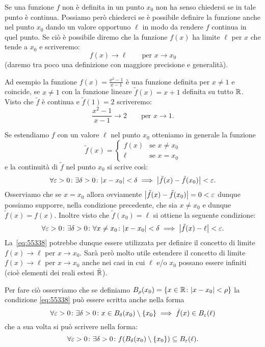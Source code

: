 Se una funzione $f$ non è definita in un punto $x_0$ non ha senso chiedersi
se in tale punto è continua. 
Possiamo però chiederci se è possibile definire la funzione anche nel punto 
$x_0$ dando un valore opportuno $\ell$ in modo da rendere $f$ continua 
in quel punto. 
Se ciò è possibile diremo che la funzione $f(x)$ ha limite $\ell$ 
per $x$ che tende a $x_0$ e scriveremo:
\[
  f(x) \to \ell \qquad \text{per $x\to x_0$}
\]
(daremo tra poco una definizione con maggiore precisione e generalità).

Ad esempio la funzione $f(x) = \frac{x^2-1}{x-1}$ è una funzione definita per $x\neq 1$
e coincide, se $x\neq 1$ con la funzione lineare $\tilde f(x) = x+1$ definita 
su tutto $\mathbb R$. 
Visto che $\tilde f$ è continua e $\tilde f(1)=2$
scriveremo:
\[
  \frac{x^2-1}{x-1} \to 2
  \qquad \text{per $x\to 1$.}
\]

Se estendiamo $f$ con un valore $\ell$ nel punto $x_0$ otteniamo 
in generale la funzione 
\[
  \tilde f(x) = \begin{cases}
    f(x) & \text{se $x\neq x_0$}\\
    \ell & \text{se $x=x_0$}
  \end{cases}  
\]
e la continuità di $\tilde f$ nel punto $x_0$ si scrive così:
\[
\forall\varepsilon>0\colon \exists \delta>0\colon
{\left|x-x_0\right|}<\delta \implies {\left|\tilde f(x)-\tilde f(x_0)\right|}<\varepsilon.  
\]
Osserviamo che se $x=x_0$ allora ovviamente ${\left|\tilde f(x)-\tilde f(x_0)\right|}
= 0 < \varepsilon$ dunque possiamo supporre, nella condizione precedente, 
che sia $x\neq x_0$ e dunque $\tilde f(x)=f(x)$. 
Inoltre visto che $\tilde f(x_0)=\ell$ si ottiene 
la seguente condizione:
\begin{equation}\label{eq:55338}
\forall \varepsilon>0\colon \exists \delta >0 \colon 
  \forall x\neq x_0\colon
  {\left|x-x_0\right|}<\delta \implies {\left|\tilde f(x) - \ell\right|} < \varepsilon.
\end{equation}
La~\eqref{eq:55338} potrebbe dunque essere utilizzata per definire 
il concetto di limite $f(x)\to \ell$ per $x\to x_0$.
Sarà però molto utile estendere il concetto di limite $f(x)\to \ell$ 
per $x\to x_0$ anche nei casi in cui $\ell$ e/o $x_0$ possano 
essere infiniti (cioè elementi dei reali estesi $\bar {\mathbb R}$).

Per fare ciò osserviamo che
se definiamo $B_\rho(x_0) = {\left\{ x\in \mathbb R \colon {\left|x-x_0\right|}<\rho \right\}}$
la condizione \eqref{eq:55338}
può essere scritta anche nella forma 
\[
  \forall \varepsilon>0\colon \exists \delta >0 \colon 
  x \in B_\delta(x_0)\setminus{\left\{ x_0 \right\}} \implies \tilde f(x) \in B_\varepsilon(\ell)  
\]
che a sua volta si può scrivere nella forma:
\[
  \forall \varepsilon>0\colon \exists \delta >0 \colon 
  f(B_\delta(x_0)\setminus{\left\{ x_0 \right\}}) \subseteq  B_\varepsilon(\ell).    
\]

